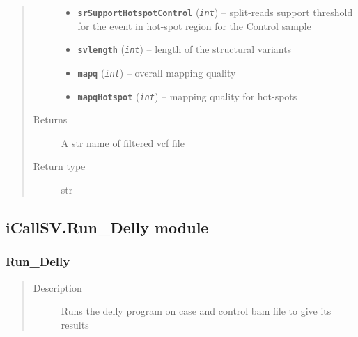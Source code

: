 \documentclass[letterpaper,10pt,english]{sphinxmanual}
\begin{document}
\begin{fulllineitems}
\begin{quote}
\begin{description}
\begin{itemize}
\item {} 
\textbf{\texttt{srSupportHotspotControl}} (\emph{\texttt{int}}) -- split-reads support threshold for the event in hot-spot region for the Control sample

\item {} 
\textbf{\texttt{svlength}} (\emph{\texttt{int}}) -- length of the structural variants

\item {} 
\textbf{\texttt{mapq}} (\emph{\texttt{int}}) -- overall mapping quality

\item {} 
\textbf{\texttt{mapqHotspot}} (\emph{\texttt{int}}) -- mapping quality for hot-spots

\end{itemize}

\item[{Returns}] \leavevmode
A str name of filtered vcf file

\item[{Return type}] \leavevmode
str

\end{description}\end{quote}

\end{fulllineitems}



\subsection{iCallSV.Run\_Delly module}
\label{iCallSV:module-iCallSV.Run_Delly}\label{iCallSV:icallsv-run-delly-module}

\subsubsection{Run\_Delly}
\label{iCallSV:run-delly}\begin{quote}\begin{description}
\item[{Description}] \leavevmode
Runs the delly program on case and control bam file to give its results

\end{description}\end{quote}
\end{document}
